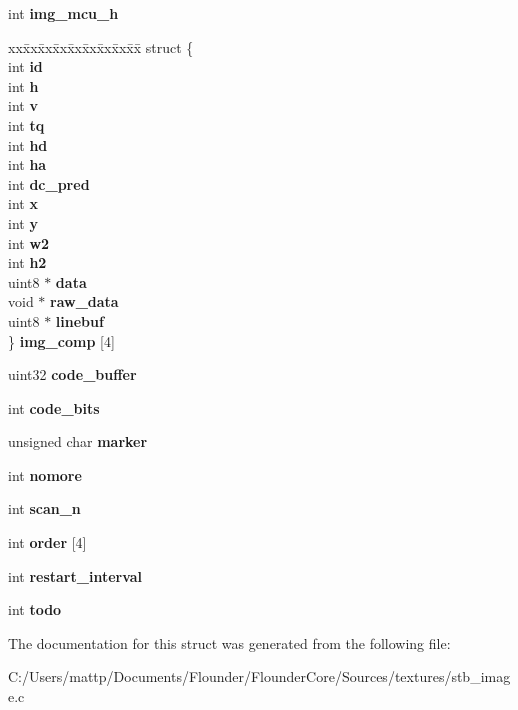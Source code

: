 \begin{DoxyCompactItemize}
int {\bfseries img\+\_\+mcu\+\_\+h}
\item 
\mbox{\label{structjpeg_a1c4874d5cf0e2b80dc0d0b47ddd8be7a}} 
\begin{tabbing}
xx\=xx\=xx\=xx\=xx\=xx\=xx\=xx\=xx\=\kill
struct \{\\
\>int {\bfseries id}\\
\>int {\bfseries h}\\
\>int {\bfseries v}\\
\>int {\bfseries tq}\\
\>int {\bfseries hd}\\
\>int {\bfseries ha}\\
\>int {\bfseries dc\_pred}\\
\>int {\bfseries x}\\
\>int {\bfseries y}\\
\>int {\bfseries w2}\\
\>int {\bfseries h2}\\
\>uint8 $\ast$ {\bfseries data}\\
\>void $\ast$ {\bfseries raw\_data}\\
\>uint8 $\ast$ {\bfseries linebuf}\\
\} {\bfseries img\_comp} \mbox{[}4\mbox{]}\\

\end{tabbing}\item 
\mbox{\label{structjpeg_abfc7f6a333ba3517e669e3e58113bbca}} 
uint32 {\bfseries code\+\_\+buffer}
\item 
\mbox{\label{structjpeg_a6d1b20b5d9d253006fde4e4dd8ab8c04}} 
int {\bfseries code\+\_\+bits}
\item 
\mbox{\label{structjpeg_a9a5cd40790fd432795fb19477c921f8c}} 
unsigned char {\bfseries marker}
\item 
\mbox{\label{structjpeg_a2d114f4d52f50d8d85f43b2a3f161cec}} 
int {\bfseries nomore}
\item 
\mbox{\label{structjpeg_adca2f04da72e50086c77c7070731a679}} 
int {\bfseries scan\+\_\+n}
\item 
\mbox{\label{structjpeg_ac0f5240fc472e75239328f51a50f45b6}} 
int {\bfseries order} \mbox{[}4\mbox{]}
\item 
\mbox{\label{structjpeg_ab13af34259b1f1c6cf8f35411a77e39e}} 
int {\bfseries restart\+\_\+interval}
\item 
\mbox{\label{structjpeg_a6b4a8a352872847d84ea5ef1a4bc245e}} 
int {\bfseries todo}
\end{DoxyCompactItemize}


The documentation for this struct was generated from the following file\+:\begin{DoxyCompactItemize}
\item 
C\+:/\+Users/mattp/\+Documents/\+Flounder/\+Flounder\+Core/\+Sources/textures/stb\+\_\+image.\+c\end{DoxyCompactItemize}
